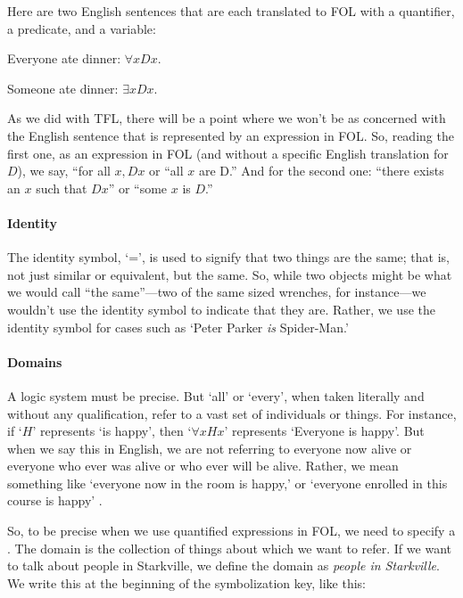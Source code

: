Here are two English sentences that are each translated to FOL with a quantifier, a predicate, and a variable:

\begin{ebullet}
	\item[] Everyone ate dinner: $\forall x Dx$. 
	\item[] Someone ate dinner: $\exists x Dx$.
\end{ebullet}

As we did with TFL, there will be a point where we won’t be as concerned with the English sentence that is represented by an expression in FOL. So, reading the first one, as an expression in FOL (and without a specific English translation for $D$), we say, ``for all $x, Dx$ or ``all $x$ are D.'' And for the second one: ``there exists an $x$ such that $Dx$” or ``some $x$ is $D$.'' 


\paragraph{Identity}

The identity symbol, `=’, is used to signify that two things are the same; that is, not just similar or equivalent, but the same. So, while two objects might be what we would call ``the same''---two of the same sized wrenches, for instance---we wouldn't use the identity symbol to indicate that they are. Rather, we use the identity symbol for cases such as `Peter Parker \textit{is} Spider-Man.’ 


\paragraph{Domains}

A logic system must be precise. But `all’ or `every’, when taken literally and without any qualification, refer to a vast set of individuals or things. For instance, if `$H$' represents `is happy’, then ‘$\forall x Hx$’ represents ‘Everyone is happy’. But when we say this in English, we are not referring to everyone now alive or everyone who ever was alive or who ever will be alive. Rather, we mean something like `everyone now in the room is happy,’ or `everyone enrolled in this course is happy’ {\libser \Large{}}.
 

So, to be precise when we use quantified expressions in FOL, we need to specify a . The domain is the collection of things about which we want to refer. If we want to talk about people in Starkville, we define the domain as \textit{people in Starkville}. We write this at the beginning of the symbolization key, like this:

